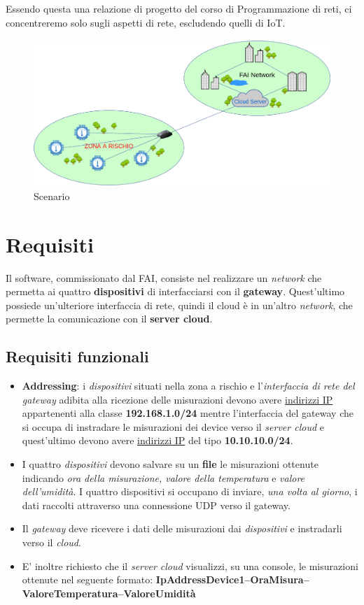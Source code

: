 \documentclass[a4paper,12pt]{report}
\begin{document}
Essendo questa una relazione di progetto del corso di Programmazione di reti, ci concentreremo solo sugli aspetti di rete, escludendo quelli di IoT.
\newline
\newline
\newline
\begin{figure}
\centering{}
\includegraphics[width=\textwidth, height=15em]{img/Scenario.png}
\caption{Scenario}
\label{img:analysis}
\end{figure}

\section{Requisiti}

Il software, commissionato dal FAI, consiste nel realizzare un \emph{network} che permetta ai quattro \textbf{dispositivi} di interfacciarsi con il \textbf{gateway}.
%
Quest'ultimo possiede un'ulteriore interfaccia di rete, quindi il cloud è in un'altro \emph{network}, che permette la comunicazione con il \textbf{server cloud}.

\subsection*{Requisiti funzionali}
\begin{itemize}
	\item \textbf{Addressing}: i \emph{dispositivi} situati nella zona a rischio e l'\emph{interfaccia di rete del gateway} adibita alla ricezione delle misurazioni devono avere \underline{indirizzi IP} appartenenti alla classe \textbf{192.168.1.0/24} mentre l'interfaccia del gateway che si occupa di instradare le misurazioni dei device verso il \emph{server cloud} e quest'ultimo devono avere \underline{indirizzi IP} del tipo \textbf{10.10.10.0/24}.
	\item I quattro \emph{dispositivi} devono salvare su un \textbf{file} le misurazioni ottenute indicando \emph{ora della misurazione, valore della temperatura} e \emph{valore dell'umidità}.
	I quattro dispositivi si occupano di inviare, \emph{una volta al giorno}, i dati raccolti attraverso una connessione UDP verso il gateway.
	\item Il \emph{gateway} deve ricevere i dati delle misurazioni dai \emph{dispositivi} e instradarli verso il \emph{cloud}.
	\item E' inoltre richiesto che il \emph{server cloud} visualizzi, su una console, le misurazioni ottenute nel seguente formato:
	\newline
    \textbf{IpAddressDevice1–OraMisura–ValoreTemperatura–ValoreUmidità}
\end{itemize}
\end{document}
